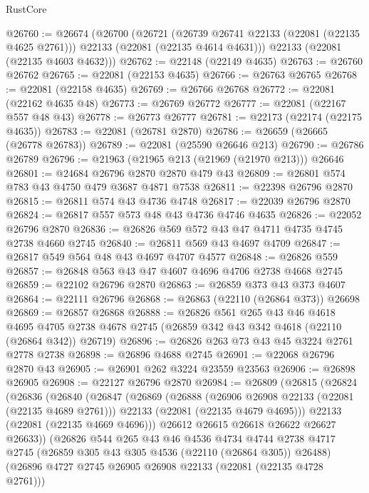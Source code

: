 \begin{lexlean}{RustCore}
\begin{coremodule}
@26760 := @26674
    (@26700
      (@26721
        (@26739 @26741 @22133 (@22081 (@22135 @4625 @2761)))
        @22133
        (@22081 (@22135 @4614 @4631)))
      @22133
      (@22081 (@22135 @4603 @4632)))
@26762 := @22148 (@22149 @4635)
@26763 := @26760 @26762
@26765 := @22081 (@22153 @4635)
@26766 := @26763 @26765
@26768 := @22081 (@22158 @4635)
@26769 := @26766 @26768
@26772 := @22081 (@22162 @4635 @48)
@26773 := @26769 @26772
@26777 := @22081 (@22167 @557 @48 @43)
@26778 := @26773 @26777
@26781 := @22173 (@22174 (@22175 @4635))
@26783 := @22081 (@26781 @2870)
@26786 := @26659 (@26665 (@26778 @26783))
@26789 := @22081 (@25590 @26646 @213)
@26790 := @26786 @26789
@26796 := @21963 (@21965 @213 (@21969 (@21970 @213))) @26646
@26801 := @24684 @26796 @2870 @2870 @479 @43
@26809 := @26801 @574 @783 @43 @4750 @479 @3687 @4871 @7538
@26811 := @22398 @26796 @2870
@26815 := @26811 @574 @43 @4736 @4748
@26817 := @22039 @26796 @2870
@26824 := @26817 @557 @573 @48 @43 @4736 @4746 @4635
@26826 := @22052 @26796 @2870
@26836 := @26826 @569 @572 @43 @47 @4711 @4735 @4745 @2738 @4660 @2745
@26840 := @26811 @569 @43 @4697 @4709
@26847 := @26817 @549 @564 @48 @43 @4697 @4707 @4577
@26848 := @26826 @559
@26857 := @26848 @563 @43 @47 @4607 @4696 @4706 @2738 @4668 @2745
@26859 := @22102 @26796 @2870
@26863 := @26859 @373 @43 @373 @4607
@26864 := @22111 @26796
@26868 := @26863 (@22110 (@26864 @373)) @26698
@26869 := @26857 @26868
@26888 := @26826
    @561
    @265
    @43
    @46
    @4618
    @4695
    @4705
    @2738
    @4678
    @2745
    (@26859 @342 @43 @342 @4618 (@22110 (@26864 @342)) @26719)
@26896 := @26826 @263 @73 @43 @45 @3224 @2761 @2778 @2738
@26898 := @26896 @4688 @2745
@26901 := @22068 @26796 @2870 @43
@26905 := @26901 @262 @3224 @23559 @23563
@26906 := @26898 @26905
@26908 := @22127 @26796 @2870
@26984 := @26809
    (@26815
      (@26824
        (@26836
          (@26840
            (@26847
              (@26869
                (@26888
                  (@26906 @26908 @22133 (@22081 (@22135 @4689 @2761)))
                  @22133
                  (@22081 (@22135 @4679 @4695)))
                @22133
                (@22081 (@22135 @4669 @4696)))
              @26612
              @26615
              @26618
              @26622
              @26627
              @26633))
          (@26826
            @544
            @265
            @43
            @46
            @4536
            @4734
            @4744
            @2738
            @4717
            @2745
            (@26859 @305 @43 @305 @4536 (@22110 (@26864 @305)) @26488)
            (@26896 @4727 @2745 @26905 @26908 @22133 (@22081 (@22135 @4728 @2761)))

\end{coremodule}
\end{lexlean}
